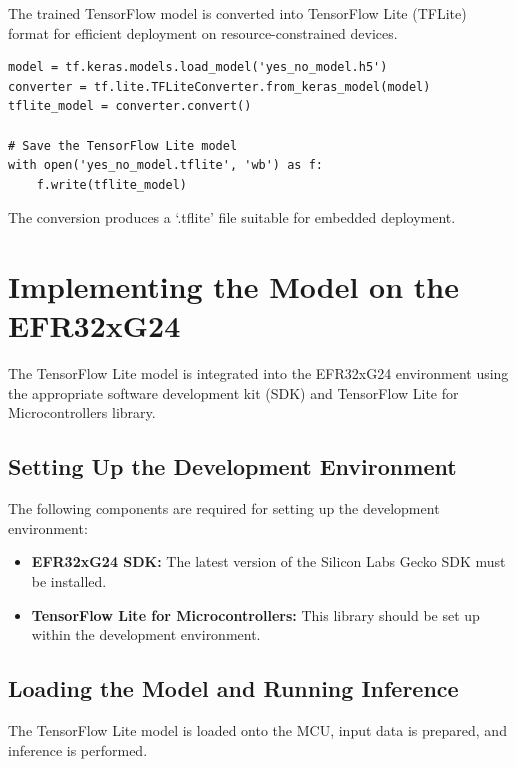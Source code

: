 \documentclass[
  9pt,
  letterpaper,
  abstract,
  titlepage]{scrbook}
\begin{document}
The trained TensorFlow model is converted into TensorFlow Lite (TFLite)
format for efficient deployment on resource-constrained devices.

\begin{verbatim}
model = tf.keras.models.load_model('yes_no_model.h5')
converter = tf.lite.TFLiteConverter.from_keras_model(model)
tflite_model = converter.convert()

# Save the TensorFlow Lite model
with open('yes_no_model.tflite', 'wb') as f:
    f.write(tflite_model)
\end{verbatim}

The conversion produces a `.tflite' file suitable for embedded
deployment.

\section{Implementing the Model on the
EFR32xG24}\label{implementing-the-model-on-the-efr32xg24}

The TensorFlow Lite model is integrated into the EFR32xG24 environment
using the appropriate software development kit (SDK) and TensorFlow Lite
for Microcontrollers library.

\subsection{Setting Up the Development
Environment}\label{setting-up-the-development-environment}

The following components are required for setting up the development
environment:

\begin{itemize}
\item
  \textbf{EFR32xG24 SDK:} The latest version of the Silicon Labs Gecko
  SDK must be installed.
\item
  \textbf{TensorFlow Lite for Microcontrollers:} This library should be
  set up within the development environment.
\end{itemize}

\subsection{Loading the Model and Running
Inference}\label{loading-the-model-and-running-inference}

The TensorFlow Lite model is loaded onto the MCU, input data is
prepared, and inference is performed.
\end{document}
